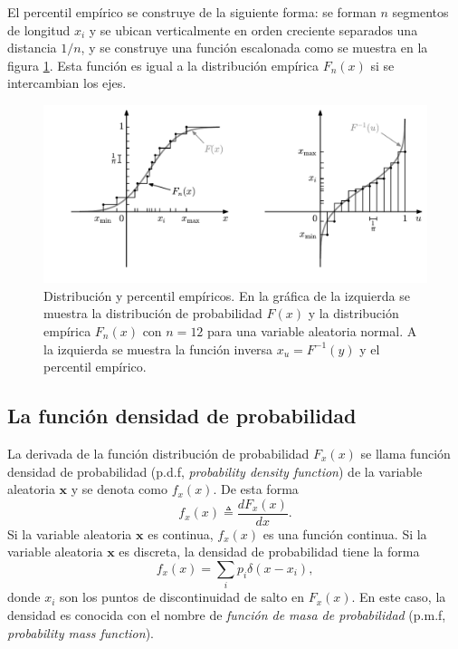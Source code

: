\documentclass[a4paper]{report}
\newcommand{\x}{\mathbf{x}}
\begin{document}
El percentil empírico se construye de la siguiente forma: se forman \(n\) segmentos de longitud \(x_i\) y se ubican verticalmente en orden creciente separados una distancia \(1/n\), y se construye una función escalonada como se muestra en la figura \ref{fig:percentiles_frequency_interpretation}. Esta función es igual a la distribución empírica \(F_n(x)\) si se intercambian los ejes.
\begin{figure}[!htb]
\begin{center}
\includegraphics[width=0.9\columnwidth]{figuras/percentiles_frequency_interpretation.pdf}
\caption{\label{fig:percentiles_frequency_interpretation} Distribución y percentil empíricos. En la gráfica de la izquierda se muestra la distribución de probabilidad \(F(x)\) y la distribución empírica \(F_n(x)\) con \(n=12\) para una variable aleatoria normal. A la izquierda se muestra la función inversa \(x_u=F^{-1}(y)\) y el percentil empírico.}
\end{center}
\end{figure}

\subsection{La función densidad de probabilidad}

La derivada de la función distribución de probabilidad \(F_x(x)\) se llama función densidad de probabilidad (p.d.f, \emph{probability density function}) de la variable aleatoria \(\x\) y se denota como \(f_x(x)\). De esta forma
\begin{equation}\label{eq:density_function_definition}
 f_x(x)\triangleq\frac{dF_x(x)}{dx}.
\end{equation}
Si la variable aleatoria \(\x\) es continua, \(f_x(x)\) es una función continua. Si la variable aleatoria \(\x\) es discreta, la densidad de probabilidad tiene la forma
\[
 f_x(x)=\sum_i p_i\delta(x-x_i),
\]
donde \(x_i\) son los puntos de discontinuidad de salto en \(F_x(x)\). En este caso, la densidad es conocida con el nombre de \emph{función de masa de probabilidad} (p.m.f, \emph{probability mass function}).
\end{document}

